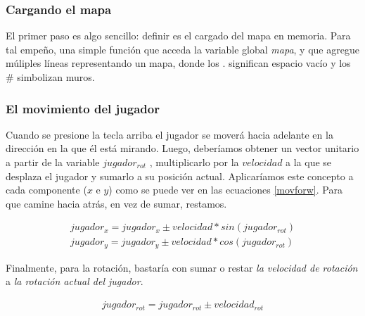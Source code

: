 

\subsubsection{Cargando el mapa}

El primer paso es algo sencillo: definir es el cargado del mapa en memoria. Para tal empeño, una simple función que acceda la variable global \emph{mapa}, y que agregue múliples líneas representando un mapa, donde los $.$ significan espacio vacío y los $\#$  simbolizan muros.




\subsubsection{El movimiento del jugador}

Cuando se presione la tecla arriba el jugador se moverá hacia adelante en la dirección en la que él está mirando. Luego, deberíamos obtener un vector unitario a partir de la variable $jugador_{rot}$ , multiplicarlo por la $velocidad$ a la que se desplaza el jugador y sumarlo a su posición actual. Aplicaríamos este concepto a cada componente ($x$ e $y$) como se puede ver en las ecuaciones \ref{movforw}. Para que camine hacia atrás, en vez de sumar, restamos. 

\begin{equation}
\begin{aligned}
\label{movforw}
jugador_x = jugador_x \pm velocidad * sin(jugador_{rot})  \\
jugador_y = jugador_y \pm velocidad * cos(jugador_{rot})
\end{aligned}
\end{equation}

Finalmente, para la rotación, bastaría con sumar o restar \emph{la velocidad de rotación} a \emph{la rotación actual del jugador}.

\begin{equation}
\begin{aligned}
\label{eq-rot}
jugador_{rot} = jugador_{rot} \pm velocidad_{rot}
\end{aligned}
\end{equation}





